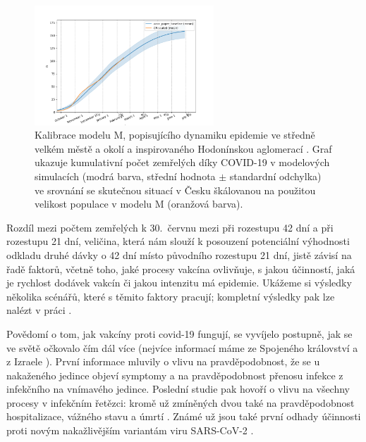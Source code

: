 \begin{figure}[h]
	\centering
	\includegraphics[width=0.6\textwidth]{pic/death_vacc_d.png}
	\caption{Kalibrace modelu M, popisujícího dynamiku epidemie ve středně velkém městě a okolí a inspirovaného Hodonínskou aglomerací \cite{M-techrep2021}. Graf ukazuje kumulativní počet zemřelých díky COVID-19 v modelových simulacích (modrá barva, střední hodnota $\pm$ standardní odchylka) ve srovnání se skutečnou situací v Česku škálovanou na použitou velikost populace v modelu M (oranžová barva).}
	\label{kalibraceM}
\end{figure}

Rozdíl mezi počtem zemřelých k 30.\ červnu mezi při rozestupu 42 dní a při rozestupu 21 dní, veličina, která nám slouží k posouzení potenciální výhodnosti odkladu druhé dávky o 42 dní místo původního rozestupu 21 dní, jistě závisí na řadě faktorů, včetně toho, jaké procesy vakcína ovlivňuje, s jakou účinností, jaká je rychlost dodávek vakcín či jakou intenzitu má epidemie. Ukážeme si výsledky několika scénářů, které s těmito faktory pracují; kompletní výsledky pak lze nalézt v práci \cite{vaccpaper}.

Povědomí o tom, jak vakcíny proti covid-19 fungují, se vyvíjelo postupně, jak se ve světě očkovalo čím dál více (nejvíce informací máme ze Spojeného království \cite{Hall_etal2021,Vasileiou_etal2021} a z Izraele \cite{Haas_etal2021}). První informace mluvily o vlivu na pravděpodobnost, že se u nakaženého jedince objeví symptomy a na pravděpodobnost přenosu infekce z infekčního na vnímavého jedince. Poslední studie pak hovoří o vlivu na všechny procesy v infekčním řetězci: kromě už zmíněných dvou také na pravděpodobnost hospitalizace, vážného stavu a úmrtí \cite{Haas_etal2021}. Známé už jsou také první odhady účinnosti proti novým nakažlivějším variantám viru SARS-CoV-2 \cite[a reference uvnitř]{Shapiro_etal2021,delta}. 

